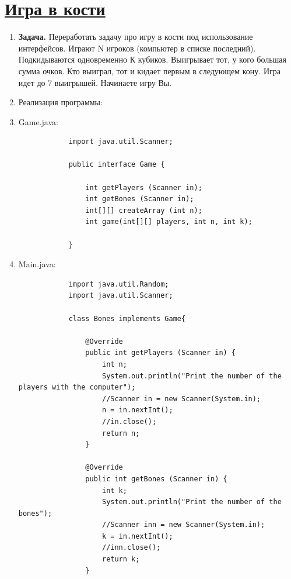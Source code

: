 \documentclass[a4paper]{article}
\begin{document}
\section{\href{https://github.com/julproh/5_sem/tree/main/NetCracker/Java_Basics_and_OOP/practise_tasks/second_task/bones}{Игра в кости}} 

    \begin{enumerate}
        \item \textbf{Задача.} Переработать задачу про игру в кости под использование интерфейсов. 
        Играют N игроков (компьютер в списке последний). Подкидываются 
        одновременно К кубиков. Выигрывает тот, у кого большая сумма очков. 
        Кто выиграл, тот и кидает первым в следующем кону. Игра идет до 7 
        выигрышей. Начинаете игру Вы.

        \item Реализация программы:
        \item Game.java:
        \begin{lstlisting}
            import java.util.Scanner;

            public interface Game {
            
                int getPlayers (Scanner in);
                int getBones (Scanner in);
                int[][] createArray (int n);
                int game(int[][] players, int n, int k);
            
            }
        \end{lstlisting}

        \item Main.java:
        
        \begin{lstlisting}
            import java.util.Random;
            import java.util.Scanner;

            class Bones implements Game{

                @Override
                public int getPlayers (Scanner in) {
                    int n;
                    System.out.println("Print the number of the players with the computer");
                    //Scanner in = new Scanner(System.in);
                    n = in.nextInt();
                    //in.close();
                    return n;
                }

                @Override
                public int getBones (Scanner in) {
                    int k;
                    System.out.println("Print the number of the bones");
                    //Scanner inn = new Scanner(System.in);
                    k = in.nextInt();
                    //inn.close();
                    return k;
                }


\end{lstlisting}
\end{enumerate}
\end{document}
